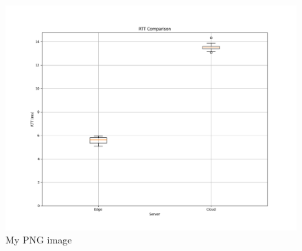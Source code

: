 \documentclass[12pt,a4paper,twoside]{report}
\begin{document}
\begin{figure}[ht]
	\centering
	\includegraphics[width=13cm]{./images/RTT_comp_box.png} 
	\caption{My PNG image}
\end{figure}
%



\clearpage

%

%
%
	
	
\end{document}
